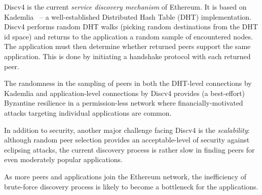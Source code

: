 
 Discv4 is the current \textit{service discovery mechanism} of Ethereum. It is based on Kademlia~\cite{maymounkov2002kademlia} – a well-established Distributed Hash Table (DHT) implementation. Discv4 performs random DHT walks (picking random destinations from the DHT id space) and returns to the application a random sample of encountered nodes. The application must then determine whether returned peers support the same application. This is done by initiating a handshake protocol with each returned peer. 


The randomness in the sampling of peers in both the DHT-level connections by Kademlia and application-level connections by Discv4 provides (a best-effort) Byzantine resilience in a permission-less network where financially-motivated attacks targeting individual applications are common.
 

In addition to security, another major challenge facing Discv4 is the \textit{scalability}: although random peer selection provides an acceptable-level of security against eclipsing attacks, the current discovery process is rather slow in finding peers for even moderately popular applications. 

As more peers and applications join the Ethereum network, the inefficiency of brute-force discovery process is likely to become a bottleneck for the applications.

